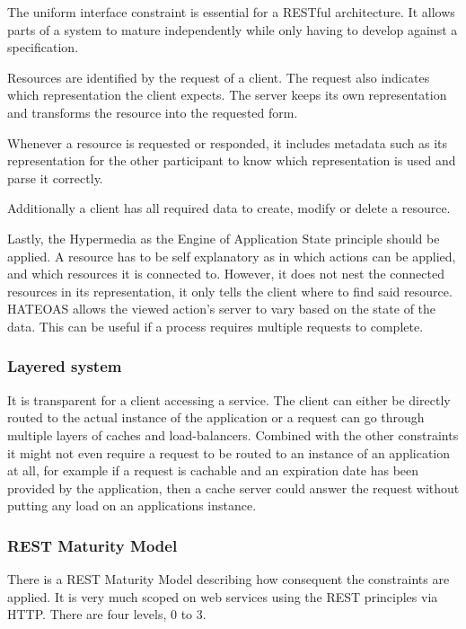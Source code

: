 The uniform interface constraint is essential for a RESTful architecture. It
allows parts of a system to mature independently while only having to develop
against a specification.

Resources are identified by the request of a client. The request also indicates
which representation the client expects. The server keeps its own representation
and transforms the resource into the requested form.

Whenever a resource is requested or responded, it includes metadata such as its
representation for the other participant to know which representation is used
and parse it correctly.

Additionally a client has all required data to create, modify or delete a
resource.

Lastly, the Hypermedia as the Engine of Application State principle should be
applied. A resource has to be self explanatory as in which actions can be
applied, and which resources it is connected to. However, it does not nest the
connected resources in its representation, it only tells the client where to
find said resource. HATEOAS allows the viewed action's server to vary based on
the state of the data. This can be useful if a process requires multiple
requests to complete.

\subsubsection{Layered system}

It is transparent for a client accessing a service. The client can either be
directly routed to the actual instance of the application or a request can go
through multiple layers of caches and load-balancers. Combined with the other
constraints it might not even require a request to be routed to an instance of
an application at all, for example if a request is cachable and an expiration
date has been provided by the application, then a cache server could answer the
request without putting any load on an applications instance.

\subsubsection{REST Maturity Model}

There is a REST Maturity Model describing how consequent the constraints are
applied. It is very much scoped on web services using the REST principles via
HTTP. There are four levels, 0 to 3.

